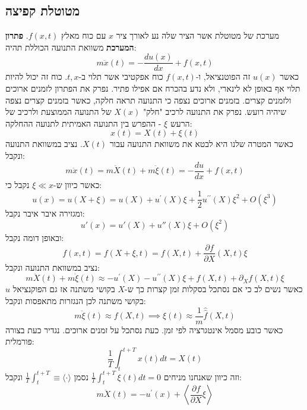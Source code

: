 \documentclass{tstextbook}
\begin{document}
\subsection{מטוטלת קפיצה}

מערכת של מטוטלת אשר הציר שלה נע לאורך ציר \(x\) עם כוח מאלץ \(f(x,t)\).
\textbf{פתרון המערכת}
משוואת התנועה הכוללת תהיה:
$$m{\ddot{x}}\left(t\right)=-{\frac{d u\left(x\right)}{d x}}+f\left(x,t\right)$$
כאשר \(u(x)\) זה הפוטנציאל, ו-\(f(x,t)\) כוח אפקטיבי אשר תלוי ב-\(t,x\). כוח זה יכול להיות תלוי אף באופן לא לינארי, ולא נדע בהכרח אם אפילו פתיר. נפרק את הפתרון לזמנים ארוכים ולזמנים קצרים. בזמנים ארוכים נצפה כי התנועה תראה חלקה, כאשר בזמנים קצרים נצפה שיהיה רועש. נפרק את התנועה לרכיב "חלק" \(X(x)\) של התנועה הממוצעת ולרכיב של הרעש \(\xi\) - ההפרש בין התנועה האמיתית לתנועה ההחלקה:
$$x\left(t\right)=X\left(t\right)+\xi\left(t\right)$$
כאשר המטרה שלנו היא לבטא את משוואת התנועה עבור \(X(t)\).
נציב במשוואת התנועה ונקבל:
$$m{\ddot{x}}\left(t\right)=m{\ddot{X}}\left(t\right)+m{\ddot{\xi}}\left(t\right)=-{\frac{d u}{d x}}+f\left(x,t\right)$$
כאשר כיוון ש-\(\xi \ll x\) נקבל כי:
$$u\left(x\right)=u\left(X+\xi\right)=u\left(X\right)+u^{\prime}\left(X\right)\xi+\frac{1}{2}u^{\prime\prime}\left(X\right)\xi^{2}+O\left( \xi^3 \right)$$
ומגזירה איבר איבר נקבל:
$$u'(x)=u'(X)+u''(X)\xi+O\left( \xi^2 \right)$$
ובאופן דומה נקבל:
$$f\left(x,t\right)=f\left(X+\xi,t\right)=f\left(X,t\right)+{\frac{\partial f}{\partial X}}\left(X,t\right)\xi$$
נציב במשוואת התנועה ונקבל:
$$m{\ddot{X}}\left(t\right)+m{\ddot{\xi}}\left(t\right)\approx-u^{\prime}\left(X\right)-u^{\prime\prime}\left(X\right)\xi+f\left(X,t\right)+\partial_{X}f\left(X,t\right)\xi$$
כאשר נשים לב כי אם נסתכל בסקלות זמן קצרות כך ש-\(X\) בקושי משתנה אז גם הפוקנציאל \(u\) בקושי משתנה לכן הנגזרות מתאפסות ונקבל:
$$m{\ddot{\xi}}\left(t\right)\approx f\left(X,t\right)\implies \xi(t)\approx \frac{1}{m}\hat{\hat{f}}(X,t)$$
כאשר כובע מסמל אינטגרציה לפי זמן. כעת נסתכל על זמנים ארוכים. נגדיר כעת בצורה פורמלית:
$${\frac{1}{T}}\int_{t}^{t+T}x\left(t\right)d t=X\left(t\right)$$
וזה כיוון שאנחנו מניחים \(\textstyle{\frac{1}{T}}\int_{t}^{t+T}\xi\left(t\right)d t=0\) נסמן \(\frac{1}{T}\int_{t}^{t+T}\equiv\langle\cdot\rangle\) ונקבל:
$$m\ddot{X}\left(t\right)=-u^{\prime}\left(x\right)+\left\langle\frac{\partial f}{\partial X}\xi\right\rangle$$
\end{document}
